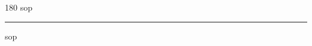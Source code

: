 
\begin{frame}
\begin{center}
\begin{turn}{180}
{\fontsize{2.5cm}{1em}\selectfont sop}
\end{turn}
\vspace{1em}\par  
\hrule
\vspace{1em}\par  
{\fontsize{2.5cm}{1em}\selectfont sop}
\end{center}
\end{frame}
